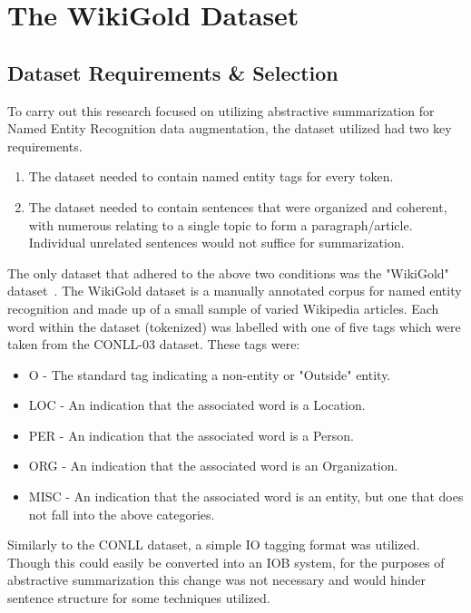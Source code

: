 \documentclass[12pt]{report}
\begin{document}
    \section{The WikiGold Dataset}
        \subsection{Dataset Requirements \& Selection}
        To carry out this research focused on utilizing abstractive summarization for Named Entity Recognition data augmentation, the dataset utilized had two key requirements.
        
        \begin{enumerate}
            \item The dataset needed to contain named entity tags for every token.
            \item The dataset needed to contain sentences that were organized and coherent, with numerous relating to a single topic to form a paragraph/article. Individual unrelated sentences would not suffice for summarization.
        \end{enumerate}
        
        The only dataset that adhered to the above two conditions was the "WikiGold" dataset~\cite{data_source}. The WikiGold dataset is a manually annotated corpus for named entity recognition and made up of a small sample of varied Wikipedia articles. Each word within the dataset (tokenized) was labelled with one of five tags which were taken from the CONLL-03 dataset. These tags were:
        
        \begin{itemize}
            \item O - The standard tag indicating a non-entity or "Outside" entity.
            \item LOC - An indication that the associated word is a Location.
            \item PER - An indication that the associated word is a Person.
            \item ORG - An indication that the associated word is an Organization.
            \item MISC - An indication that the associated word is an entity, but one that does not fall into the above categories.
        \end{itemize}
        
        Similarly to the CONLL dataset, a simple IO tagging format was utilized. Though this could easily be converted into an IOB system, for the purposes of abstractive summarization this change was not necessary and would hinder sentence structure for some techniques utilized.
        
\end{document}
